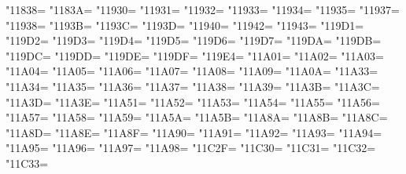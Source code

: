 \XeTeXcharclass"11838=\KclassCM
\XeTeXcharclass"1183A=\KclassCM
\XeTeXcharclass"11930=\KclassCM
\XeTeXcharclass"11931=\KclassCM
\XeTeXcharclass"11932=\KclassCM
\XeTeXcharclass"11933=\KclassCM
\XeTeXcharclass"11934=\KclassCM
\XeTeXcharclass"11935=\KclassCM
\XeTeXcharclass"11937=\KclassCM
\XeTeXcharclass"11938=\KclassCM
\XeTeXcharclass"1193B=\KclassCM
\XeTeXcharclass"1193C=\KclassCM
\XeTeXcharclass"1193D=\KclassCM
\XeTeXcharclass"11940=\KclassCM
\XeTeXcharclass"11942=\KclassCM
\XeTeXcharclass"11943=\KclassCM
\XeTeXcharclass"119D1=\KclassCM
\XeTeXcharclass"119D2=\KclassCM
\XeTeXcharclass"119D3=\KclassCM
\XeTeXcharclass"119D4=\KclassCM
\XeTeXcharclass"119D5=\KclassCM
\XeTeXcharclass"119D6=\KclassCM
\XeTeXcharclass"119D7=\KclassCM
\XeTeXcharclass"119DA=\KclassCM
\XeTeXcharclass"119DB=\KclassCM
\XeTeXcharclass"119DC=\KclassCM
\XeTeXcharclass"119DD=\KclassCM
\XeTeXcharclass"119DE=\KclassCM
\XeTeXcharclass"119DF=\KclassCM
\XeTeXcharclass"119E4=\KclassCM
\XeTeXcharclass"11A01=\KclassCM
\XeTeXcharclass"11A02=\KclassCM
\XeTeXcharclass"11A03=\KclassCM
\XeTeXcharclass"11A04=\KclassCM
\XeTeXcharclass"11A05=\KclassCM
\XeTeXcharclass"11A06=\KclassCM
\XeTeXcharclass"11A07=\KclassCM
\XeTeXcharclass"11A08=\KclassCM
\XeTeXcharclass"11A09=\KclassCM
\XeTeXcharclass"11A0A=\KclassCM
\XeTeXcharclass"11A33=\KclassCM
\XeTeXcharclass"11A34=\KclassCM
\XeTeXcharclass"11A35=\KclassCM
\XeTeXcharclass"11A36=\KclassCM
\XeTeXcharclass"11A37=\KclassCM
\XeTeXcharclass"11A38=\KclassCM
\XeTeXcharclass"11A39=\KclassCM
\XeTeXcharclass"11A3B=\KclassCM
\XeTeXcharclass"11A3C=\KclassCM
\XeTeXcharclass"11A3D=\KclassCM
\XeTeXcharclass"11A3E=\KclassCM
\XeTeXcharclass"11A51=\KclassCM
\XeTeXcharclass"11A52=\KclassCM
\XeTeXcharclass"11A53=\KclassCM
\XeTeXcharclass"11A54=\KclassCM
\XeTeXcharclass"11A55=\KclassCM
\XeTeXcharclass"11A56=\KclassCM
\XeTeXcharclass"11A57=\KclassCM
\XeTeXcharclass"11A58=\KclassCM
\XeTeXcharclass"11A59=\KclassCM
\XeTeXcharclass"11A5A=\KclassCM
\XeTeXcharclass"11A5B=\KclassCM
\XeTeXcharclass"11A8A=\KclassCM
\XeTeXcharclass"11A8B=\KclassCM
\XeTeXcharclass"11A8C=\KclassCM
\XeTeXcharclass"11A8D=\KclassCM
\XeTeXcharclass"11A8E=\KclassCM
\XeTeXcharclass"11A8F=\KclassCM
\XeTeXcharclass"11A90=\KclassCM
\XeTeXcharclass"11A91=\KclassCM
\XeTeXcharclass"11A92=\KclassCM
\XeTeXcharclass"11A93=\KclassCM
\XeTeXcharclass"11A94=\KclassCM
\XeTeXcharclass"11A95=\KclassCM
\XeTeXcharclass"11A96=\KclassCM
\XeTeXcharclass"11A97=\KclassCM
\XeTeXcharclass"11A98=\KclassCM
\XeTeXcharclass"11C2F=\KclassCM
\XeTeXcharclass"11C30=\KclassCM
\XeTeXcharclass"11C31=\KclassCM
\XeTeXcharclass"11C32=\KclassCM
\XeTeXcharclass"11C33=\KclassCM
